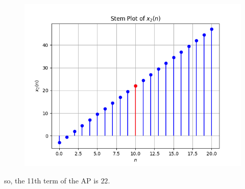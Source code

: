 \documentclass[journal,12pt,twocolumn]{IEEEtran}
\theoremstyle{remark}
\begin{document}
\begin{figure}[h!]
    \centering
    \includegraphics[width=\columnwidth]{figs/plot2.png}
    \label{fig:2}
\end{figure}
so, the 11th term of the AP is $22$.
\end{document}
